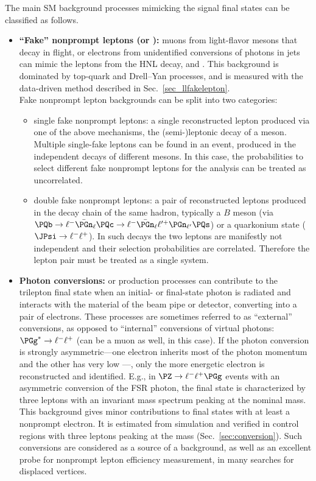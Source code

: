 The main SM background processes mimicking the signal final states can be
classified as follows.
\begin{itemize}
\item \textbf{``Fake'' nonprompt leptons (\Pe or \PGm):}
  muons from light-flavor mesons that decay in flight, or electrons from
  unidentified conversions of photons in jets
  can mimic the \displ leptons from the HNL decay, \ltwo and
  \lthree.
  This background is dominated by top-quark and Drell--Yan processes,
  and is measured with the data-driven method described in
  Sec.~\ref{sec_llfakelepton}.\\
  Fake nonprompt lepton backgrounds can be split into two categories:
  \begin{itemize}
  \item single fake nonprompt leptons:
    a single reconstructed lepton produced via one of the above
    mechanisms, \eg the (semi-)leptonic decay of a meson.
    Multiple single-fake leptons can be found in an event,
    produced in the independent decays of different mesons.
    In this case, the probabilities to select different fake nonprompt
    leptons for the analysis can be treated as uncorrelated.
  \item double fake nonprompt leptons:
    a pair of reconstructed leptons produced in the decay chain of the
    same hadron, typically a $B$ meson (\eg via
    $\PQb\to\ell^-\bar{\PGn}_{\ell}\PQc\to\ell^-\bar{\PGn}_{\ell}\ell^{\prime+}\PGn_{\ell^{\prime}}\PQs$)
    or a quarkonium state (\eg $\JPsi\to\ell^-\ell^+$).
    In such decays the two leptons are manifestly not independent and
    their selection probabilities are correlated.
    Therefore the lepton pair must be treated as a single system.
  \end{itemize}
\item \textbf{Photon conversions:}
  \PW or \PZ production processes can
  contribute to the trilepton final state when an initial- or
  final-state photon is radiated and interacts with the material of
  the beam pipe or detector, converting into a pair of electrons.
  These processes are sometimes referred to as ``external''
  conversions, as opposed to ``internal'' conversions of virtual
  photons: $\PGg^\ast\to\ell^-\ell^+$ (\lept can be a muon as well, in
  this case).
  If the photon conversion is strongly asymmetric---\ie one electron
  inherits most of the photon momentum and the other has very low
  \pt---, only the more energetic electron is reconstructed and
  identified. E.g., in $\PZ\to\ell^-\ell^+\PGg$ events with an
  asymmetric conversion of the FSR photon, the final state is
  characterized by three leptons with an invariant mass spectrum
  peaking at the nominal \PZ mass.
  This background gives minor contributions
  to final states with at least a nonprompt electron.
  It is estimated from simulation and verified in control regions with
  three leptons peaking at the \PZ mass (Sec.~\ref{sec:conversion}).
  Such conversions are considered as a
  source of a background, as well as an excellent probe for nonprompt
  lepton efficiency
 measurement, in many searches for displaced vertices.


\end{itemize}
